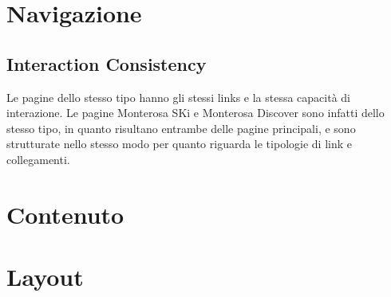     \section{Navigazione}
        \subsection{Interaction Consistency}
        Le pagine dello stesso tipo hanno gli stessi links e la stessa capacità
        di interazione. Le pagine Monterosa SKi e Monterosa Discover sono
        infatti dello stesso tipo, in quanto risultano entrambe delle pagine
        principali, e sono strutturate nello stesso modo per quanto riguarda le
        tipologie di link e collegamenti.
        \begin{figure}[H]
        \end{figure}
        \subsection{}
  
    \section{Contenuto}
        \subsection{}

    \section{Layout}
        \subsection{}
